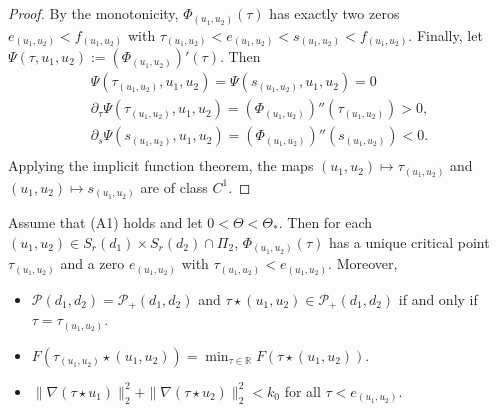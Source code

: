\documentclass[reqno]{amsart}
\begin{document}
\begin{proof}
By the monotonicity, $\Phi_{(u_1,u_2)}(\tau)$ has exactly two zeros
$e_{(u_1,u_2)}<f_{(u_1,u_2)}$ with
$\tau_{(u_1,u_2)}<e_{(u_1,u_2)}<s_{(u_1,u_2)}<f_{(u_1,u_2)}$.
Finally, let $\varPsi(\tau,u_1,u_2):=(\Phi_{(u_1,u_2)})'(\tau)$. Then
\begin{gather*}
\varPsi(\tau_{(u_1,u_2)},u_1,u_2)=\varPsi(s_{(u_1,u_2)},u_1,u_2)=0\\
\partial_{\tau}\varPsi(\tau_{(u_1,u_2)},u_1,u_2)=(\Phi_{(u_1,u_2)})''(\tau_{(u_1,u_2)})>0,\\
\partial_{s}\varPsi(s_{(u_1,u_2)},u_1,u_2)=(\Phi_{(u_1,u_2)})''(s_{(u_1,u_2)})<0.\\
\end{gather*}
Applying the implicit function theorem, the maps $(u_1,u_2)\mapsto \tau_{(u_1,u_2)}$
and $(u_1,u_2)\mapsto s_{(u_1,u_2)}$ are of class $C^1$.
\end{proof}

\begin{lemma}\label{jiap6}
Assume that {\rm (A1)} holds and let $0<\Theta<\Theta_*$. Then for each
$(u_1,u_2)\in S_r(d_1)\times S_r(d_2)\cap\varPi_2$, $\Phi_{(u_1,u_2)}(\tau)$
 has a unique critical point $\tau_{(u_1,u_2)}$ and a zero $e_{(u_1,u_2)}$ with 
$\tau_{(u_1,u_2)}<e_{(u_1,u_2)}$. Moreover,
\begin{itemize}
\item[(i)] $\mathcal{P}(d_1,d_2)=\mathcal{P}_+(d_1,d_2)$ and 
 $\tau\star(u_1,u_2)\in\mathcal{P}_+(d_1,d_2)$ if and only if $\tau=\tau_{(u_1,u_2)}$.
 
\item[(ii)] $F(\tau_{(u_1,u_2)}\star(u_1,u_2))=\min_{\tau\in\mathbb{R}}
 F(\tau\star(u_1,u_2))$.
 
\item[(iii)] $\| \nabla(\tau\star u_1)\|_2^2+\| \nabla(\tau\star u_2)\|_2^2<k_0$ for all 
$\tau<e_{(u_1,u_2)}$.
\end{itemize}
 \end{lemma}
\end{document}
